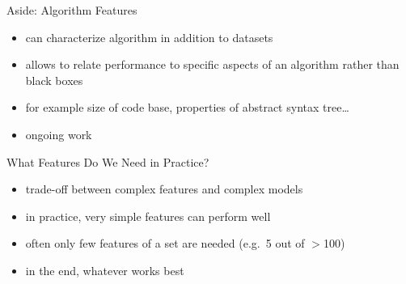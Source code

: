 \begin{frame}[c]{Aside: Algorithm Features}
    \begin{itemize}
        \item can characterize algorithm in addition to datasets
        \item allows to relate performance to specific aspects of an algorithm
            rather than black boxes
        \item for example size of code base, properties of abstract syntax
            tree\ldots
        \item ongoing work
    \end{itemize}
\end{frame}

\begin{frame}[c]{What Features Do We Need in Practice?}
    \begin{itemize}
        \item trade-off between complex features and complex models
        \item in practice, very simple features can perform well
        \item often only few features of a set are needed (e.g.\ 5 out of $>$100)
        \item in the end, whatever works best
    \end{itemize}
\end{frame}


